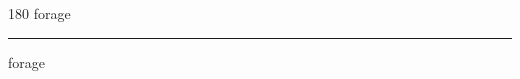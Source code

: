 
\begin{frame}
\begin{center}
\begin{turn}{180}
{\fontsize{2.5cm}{1em}\selectfont forage}
\end{turn}
\vspace{1em}\par  
\hrule
\vspace{1em}\par  
{\fontsize{2.5cm}{1em}\selectfont forage}
\end{center}
\end{frame}
